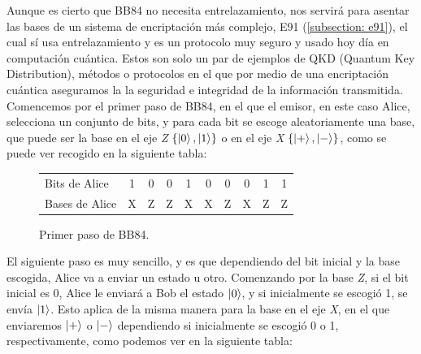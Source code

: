 \documentclass[12pt]{article}
\numberwithin{equation}{section} %
\begin{document}
    \vspace{5mm}

    Aunque es cierto que BB84 no necesita entrelazamiento, nos servirá para asentar las bases de un sistema de encriptación más complejo, E91 (\ref{subsection: e91}), el cual sí usa entrelazamiento y es un protocolo muy seguro y usado hoy día en computación cuántica. Estos son solo un par de ejemplos de QKD (Quantum Key Distribution), métodos o protocolos en el que por medio de una encriptación cuántica aseguramos la la seguridad e integridad de la información transmitida. Comencemos por el primer paso de BB84, en el que el emisor, en este caso Alice, selecciona un conjunto de bits, y para cada bit se escoge aleatoriamente una base, que puede ser la base en el eje \textit{Z} \( \{ \ket{0}, \ket{1} \} \) o en el eje \textit{X} \( \{ \ket{+}, \ket{-} \} \), como se puede ver recogido en la siguiente tabla:

    \vspace{2.5mm}

    \begin{figure}[H]
        \centering
        \renewcommand{\arraystretch}{1.25} 
        \begin{tabular}{|l|ccccccccc|}
            \hline
            Bits de Alice & 1 & 0 & 0 & 1 & 0 & 0 & 0 & 1 & 1 \\
            Bases de Alice & X & Z & Z & X & X & Z & X & Z & Z \\ \hline
        \end{tabular}
        \caption{Primer paso de BB84.}\label{fig: primer_paso_bb84}
    \end{figure}

    \vspace{2.5mm}

    El siguiente paso es muy sencillo, y es que dependiendo del bit inicial y la base escogida, Alice va a enviar un estado u otro. Comenzando por la base \textit{Z}, si el bit inicial es 0, Alice le enviará a Bob el estado \( \ket{0} \), y si inicialmente se escogió 1, se envía \( \ket{1} \). Esto aplica de la misma manera para la base en el eje \textit{X}, en el que enviaremos \( \ket{+} \) o \( \ket{-} \) dependiendo si inicialmente se escogió 0 o 1, respectivamente, como podemos ver en la siguiente tabla:

    \vspace{2.5mm}
\end{document}
